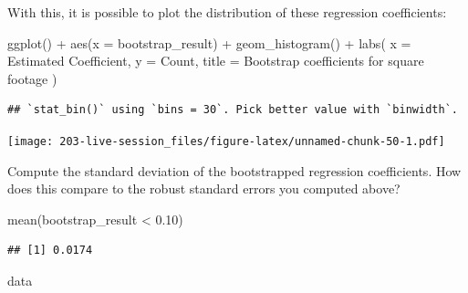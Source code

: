 \documentclass[
]{book}
\newenvironment{Shaded}{\begin{snugshade}}{\end{snugshade}}
\newcommand{\AttributeTok}[1]{\textcolor[rgb]{0.77,0.63,0.00}{#1}}
\newcommand{\FloatTok}[1]{\textcolor[rgb]{0.00,0.00,0.81}{#1}}
\newcommand{\FunctionTok}[1]{\textcolor[rgb]{0.00,0.00,0.00}{#1}}
\newcommand{\NormalTok}[1]{#1}
\newcommand{\SpecialCharTok}[1]{\textcolor[rgb]{0.00,0.00,0.00}{#1}}
\newcommand{\StringTok}[1]{\textcolor[rgb]{0.31,0.60,0.02}{#1}}
\theoremstyle{definition}
\theoremstyle{definition}
\theoremstyle{definition}
\theoremstyle{definition}
\theoremstyle{remark}
\begin{document}
With this, it is possible to plot the distribution of these regression coefficients:

\begin{Shaded}
\begin{Highlighting}[]
\FunctionTok{ggplot}\NormalTok{() }\SpecialCharTok{+} 
  \FunctionTok{aes}\NormalTok{(}\AttributeTok{x =}\NormalTok{ bootstrap\_result) }\SpecialCharTok{+} 
  \FunctionTok{geom\_histogram}\NormalTok{() }\SpecialCharTok{+} 
  \FunctionTok{labs}\NormalTok{(}
    \AttributeTok{x =} \StringTok{\textquotesingle{}Estimated Coefficient\textquotesingle{}}\NormalTok{, }
    \AttributeTok{y =} \StringTok{\textquotesingle{}Count\textquotesingle{}}\NormalTok{, }
    \AttributeTok{title =} \StringTok{\textquotesingle{}Bootstrap coefficients for square footage\textquotesingle{}}
\NormalTok{  )}
\end{Highlighting}
\end{Shaded}

\begin{verbatim}
## `stat_bin()` using `bins = 30`. Pick better value with `binwidth`.
\end{verbatim}

\texttt{[image: 203-live-session\_files/figure-latex/unnamed-chunk-50-1.pdf]}

Compute the standard deviation of the bootstrapped regression coefficients. How does this compare to the robust standard errors you computed above?

\begin{Shaded}
\begin{Highlighting}[]
\FunctionTok{mean}\NormalTok{(bootstrap\_result }\SpecialCharTok{\textless{}} \FloatTok{0.10}\NormalTok{)}
\end{Highlighting}
\end{Shaded}

\begin{verbatim}
## [1] 0.0174
\end{verbatim}

\begin{Shaded}
\begin{Highlighting}[]
\NormalTok{data}
\end{Highlighting}
\end{Shaded}
\end{document}
